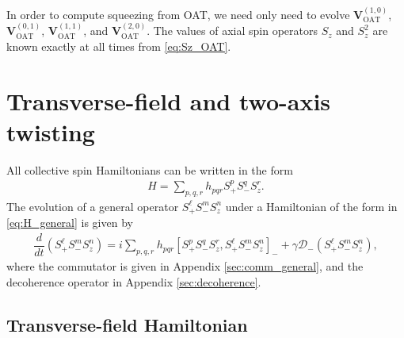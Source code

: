 \documentclass[aps,notitlepage,nofootinbib,11pt]{revtex4-1}
\renewcommand{\t}{\text} %
\newcommand{\f}[2]{\dfrac{#1}{#2}} %
\newcommand{\p}[1]{\left(#1\right)} %
\renewcommand{\sp}[1]{\left[#1\right]} %
\renewcommand{\v}{\bm} %
\newcommand{\D}{\mathcal{D}}
\newcommand{\1}{\mathds{1}}
\begin{document}
In order to compute squeezing from OAT, we need only need to evolve
$\v V_{\t{OAT}}^{(1,0)}$, $\v V_{\t{OAT}}^{(0,1)}$,
$\v V_{\t{OAT}}^{(1,1)}$, and $\v V_{\t{OAT}}^{(2,0)}$.  The values of
axial spin operators $S_z$ and $S_z^2$ are known exactly at all times
from \eqref{eq:Sz_OAT}.


\section{Transverse-field and two-axis twisting}

All collective spin Hamiltonians can be written in the form
\begin{align}
  H = \sum_{p,q,r} h_{pqr} S_+^p S_-^q S_z^r.
  \label{eq:H_general}
\end{align}
The evolution of a general operator $S_+^\ell S_-^m S_z^n$ under a
Hamiltonian of the form in \eqref{eq:H_general} is given by
\begin{align}
  \f{d}{dt} \p{S_+^\ell S_-^m S_z^n}
  = i\sum_{p,q,r} h_{pqr} \sp{S_+^p S_-^q S_z^r, S_+^\ell S_-^m S_z^n}_-
  + \gamma \D_-\p{S_+^\ell S_-^m S_z^n},
\end{align}
where the commutator is given in Appendix \ref{sec:comm_general}, and
the decoherence operator in Appendix \ref{sec:decoherence}.

\subsection{Transverse-field Hamiltonian}
\end{document}
